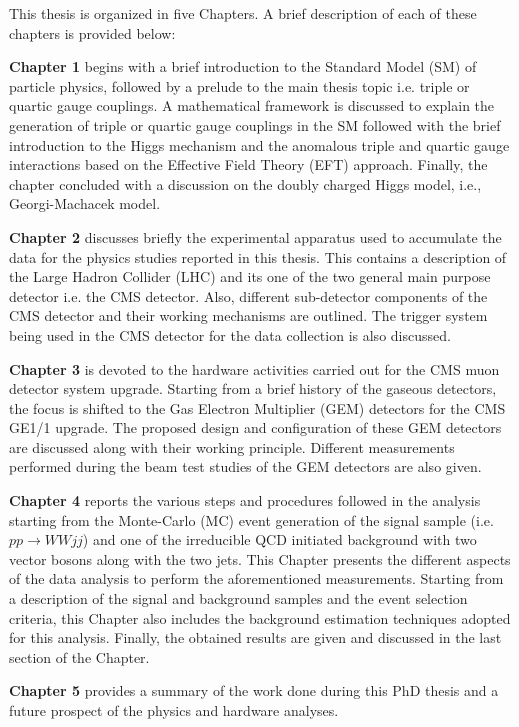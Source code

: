 This thesis is organized in five Chapters. A brief description of each of these chapters is provided below:

\textbf{Chapter 1} begins with a brief introduction to the Standard Model (SM) of particle physics, followed by a prelude to the main thesis topic i.e. triple or quartic gauge couplings. A mathematical framework is discussed to explain the generation of triple or quartic gauge couplings in the SM followed with the brief introduction to the Higgs mechanism and the anomalous triple and quartic gauge interactions based on the Effective Field Theory (EFT) approach. Finally, the chapter concluded with a discussion on the doubly charged Higgs model, i.e., Georgi-Machacek model.

\textbf{Chapter 2} discusses briefly the experimental apparatus used to accumulate the data for the physics studies reported in this thesis. This contains a description of the Large Hadron Collider (LHC) and its one of the two general main purpose detector i.e. the CMS detector. Also, different sub-detector components of the CMS detector and their working mechanisms are outlined. The trigger system being used in the CMS detector for the data collection is also discussed.

\textbf{Chapter 3} is devoted to the hardware activities carried out for the CMS muon detector system upgrade. Starting from a brief history of the gaseous detectors, the focus is shifted to the Gas Electron Multiplier (GEM) detectors for the CMS GE1/1 upgrade. The proposed design and configuration of these GEM detectors are discussed along with their working principle. Different measurements performed during the beam test studies of the GEM detectors are also given.

\textbf{Chapter 4} reports the various steps and procedures followed in the analysis starting from the Monte-Carlo (MC) event generation of the signal sample (i.e. $pp \rightarrow WWjj$) and one of the irreducible QCD initiated background with two vector bosons along with the two jets. This Chapter presents the different aspects of the data analysis to perform the aforementioned measurements. Starting from a description of the signal and background samples and the event selection criteria, this Chapter also includes the background estimation techniques adopted for this analysis. Finally, the obtained results are given and discussed in the last section of the Chapter.

\textbf{Chapter 5} provides a summary of the work done during this PhD thesis and a future prospect of the physics and hardware analyses.